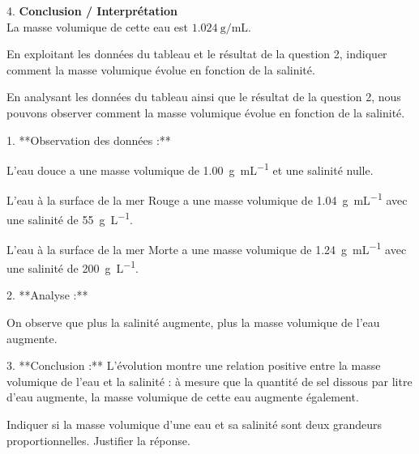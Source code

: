 \documentclass[answers]{exam}
\begin{document}
\begin{questions}
\begin{solution}
4. \textbf{Conclusion / Interprétation} \\
   La masse volumique de cette eau est \(\SI{1.024}{\gram\per\milli\liter}\).
\end{solution}

\question[2] En exploitant les données du tableau et le résultat de la question 2, indiquer comment la masse volumique évolue en fonction de la salinité.
  
  

\begin{solution}
En analysant les données du tableau ainsi que le résultat de la question 2, nous pouvons observer comment la masse volumique évolue en fonction de la salinité.

1. **Observation des données :**
   \begin{compactitem}
      \item L'eau douce a une masse volumique de \SI{1.00}{\gram\per\milli\liter} et une salinité nulle.
      \item L'eau à la surface de la mer Rouge a une masse volumique de \SI{1.04}{\gram\per\milli\liter} avec une salinité de \SI{55}{\gram\per\liter}.
      \item L'eau à la surface de la mer Morte a une masse volumique de \SI{1.24}{\gram\per\milli\liter} avec une salinité de \SI{200}{\gram\per\liter}.
   \end{compactitem}

2. **Analyse :**
   \begin{compactitem}
      \item On observe que plus la salinité augmente, plus la masse volumique de l'eau augmente.
   \end{compactitem}

3. **Conclusion :**
   L'évolution montre une relation positive entre la masse volumique de l'eau et la salinité : à mesure que la quantité de sel dissous par litre d'eau augmente, la masse volumique de cette eau augmente également.
\end{solution}

\question[2] Indiquer si la masse volumique d’une eau et sa salinité sont deux grandeurs proportionnelles. Justifier la réponse.


  \end{questions}
\end{document}
